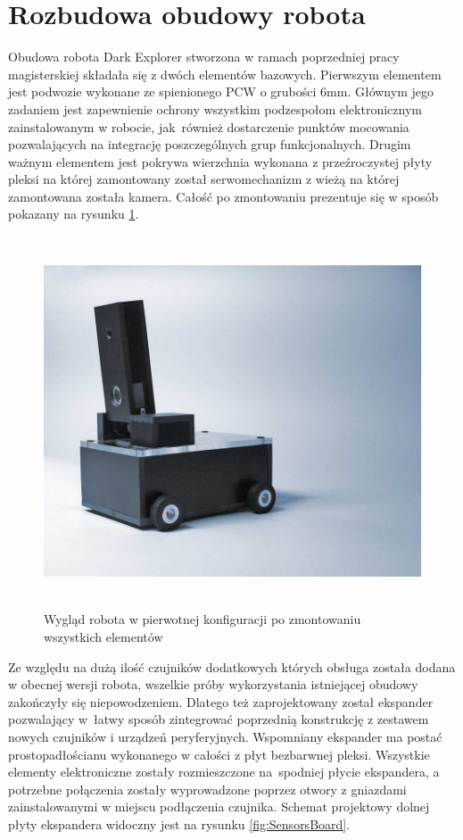 \section{Rozbudowa obudowy robota}
\label{sec:casing}
Obudowa robota Dark Explorer stworzona w ramach poprzedniej pracy magisterskiej
\cite{KmakMScThesis2009} składała się z dwóch elementów bazowych. Pierwszym
elementem jest podwozie wykonane ze spienionego PCW o grubości 6mm. Głównym jego
zadaniem jest zapewnienie ochrony wszystkim podzespołom elektronicznym
zainstalowanym w robocie, jak~również dostarczenie punktów mocowania
pozwalających na integrację poszczególnych grup funkcjonalnych. Drugim ważnym
elementem jest pokrywa wierzchnia wykonana z przeźroczystej płyty pleksi na
której zamontowany został serwomechanizm z wieżą na której zamontowana została
kamera. Całość po zmontowaniu prezentuje się w sposób pokazany na rysunku
\ref{fig:DESideView}.

\begin{figure}[ht!]
 \centering
 \includegraphics[height=110mm]{../images/ch04/de_side_view.png}
 \caption{Wygląd robota w pierwotnej konfiguracji po zmontowaniu wszystkich elementów}
 \label{fig:DESideView}
\end{figure}

Ze względu na dużą ilość czujników dodatkowych których obsługa została dodana w
obecnej wersji robota, wszelkie próby wykorzystania istniejącej obudowy
zakończyły się niepowodzeniem. Dlatego też zaprojektowany został ekspander
pozwalający w~łatwy sposób zintegrować poprzednią konstrukcję z zestawem nowych
czujników i urządzeń peryferyjnych. Wspomniany ekspander ma postać
prostopadłościanu wykonanego w całości z płyt bezbarwnej pleksi. 
Wszystkie elementy elektroniczne zostały rozmieszczone na~spodniej płycie
ekspandera, a potrzebne połączenia zostały wyprowadzone poprzez otwory z
gniazdami zainstalowanymi w miejscu podłączenia czujnika. Schemat projektowy
dolnej płyty ekspandera widoczny jest na rysunku \ref{fig:SensorsBoard}.

